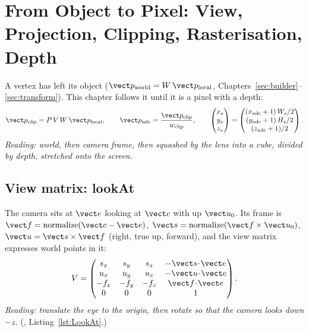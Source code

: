 \section{From Object to Pixel: View, Projection, Clipping, Rasterisation, Depth}\label{sec:geomchain}
A vertex has left its object ($\vect p_\text{world}=W\,\vect p_\text{local}$, Chapters~\ref{sec:builder}--\ref{sec:transform}). This chapter follows it until it is a pixel with a depth:
\begin{equation}
\vect p_\text{clip}=P\,V\,W\,\vect p_\text{local},\qquad \vect p_\text{ndc}=\frac{\vect p_\text{clip}}{w_\text{clip}},\qquad
\begin{pmatrix}x_s\\y_s\\z_s\end{pmatrix}=\begin{pmatrix}(x_\text{ndc}+1)\,W_s/2\\(y_\text{ndc}+1)\,H_s/2\\(z_\text{ndc}+1)/2\end{pmatrix}.
\end{equation}
\emph{Reading: world, then camera frame, then squashed by the lens into a cube, divided by depth, stretched onto the screen.}

\subsection{View matrix: lookAt}
The camera sits at $\vect e$ looking at $\vect c$ with up $\vect u_0$. Its frame is $\vect f=\mathrm{normalize}(\vect c-\vect e)$, $\vect s=\mathrm{normalize}(\vect f\times\vect u_0)$, $\vect u=\vect s\times\vect f$ (right, true up, forward), and the view matrix expresses world points in it:
\begin{equation}
V=\begin{pmatrix}s_x&s_y&s_z&-\vect s\!\cdot\!\vect e\\u_x&u_y&u_z&-\vect u\!\cdot\!\vect e\\-f_x&-f_y&-f_z&\vect f\!\cdot\!\vect e\\0&0&0&1\end{pmatrix}.
\end{equation}
\emph{Reading: translate the eye to the origin, then rotate so that the camera looks down $-z$.} (, Listing~\ref{lst:LookAt}.)
\lstLookAt

